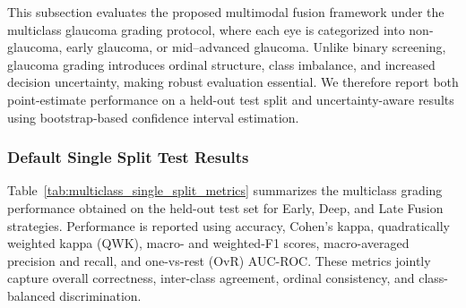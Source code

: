 \documentclass[preprint,12pt]{elsarticle}
\begin{document}
This subsection evaluates the proposed multimodal fusion framework under the multiclass glaucoma grading protocol, where each eye is categorized into non-glaucoma, early glaucoma, or mid--advanced glaucoma. Unlike binary screening, glaucoma grading introduces ordinal structure, class imbalance, and increased decision uncertainty, making robust evaluation essential. We therefore report both point-estimate performance on a held-out test split and uncertainty-aware results using bootstrap-based confidence interval estimation.

\subsubsection{Default Single Split Test Results}
\label{subsubsec:multiclass_single_split}

Table~\ref{tab:multiclass_single_split_metrics} summarizes the multiclass grading performance obtained on the held-out test set for Early, Deep, and Late Fusion strategies. Performance is reported using accuracy, Cohen’s kappa, quadratically weighted kappa (QWK), macro- and weighted-F1 scores, macro-averaged precision and recall, and one-vs-rest (OvR) AUC-ROC. These metrics jointly capture overall correctness, inter-class agreement, ordinal consistency, and class-balanced discrimination.
\end{document}
